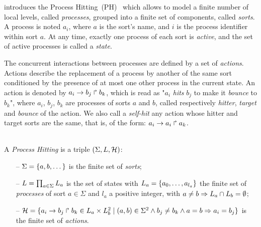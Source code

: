 

 introduces the Process Hitting~(PH)~\cite{pauleve2011modelisation}
which allows to model
a finite number of local levels,
called \emph{processes},
grouped into a finite set of components, called \emph{sorts}.
A process is noted $a_i$, where $a$ is the sort's name,
and $i$ is the process identifier within sort $a$.
At any time, exactly one process of each sort is \emph{active},
and the set of active processes is called a \emph{state}.

The concurrent interactions between processes are defined by a set of \emph{actions}.
Actions describe the replacement of a process by another of the same sort
conditioned by the presence of at most one other process in the current state.
An action is denoted by $a_i\rightarrow b_j\Rsh b_k$, which is read as
"$a_i$ \emph{hits} $b_j$ to make it \emph{bounce} to $b_k$",
where $a_i$, $b_j$, $b_k$ are processes of sorts $a$ and $b$,
called respectively \emph{hitter}, \emph{target} and
\emph{bounce} of the action.
We also call a \emph{self-hit} any action whose hitter and target sorts are the same,
that is, of the form: $a_i\rightarrow a_i\Rsh a_k$.

\begin{definition}\label{def:PH} \\
  A \emph{Process Hitting} is a triple $(\Sigma,L,\mathcal{H})$:
  \begin{itemize}
    \item[--]  $\Sigma = \{a,b,\dots\}$ is the finite set of \emph{sorts};
    \item[--]  $L = \prod_{a\in\Sigma} L_a$ is the set of states with
      $L_a = \{a_0,\dots,a_{l_a}\}$
      the finite set of \emph{processes} of sort $a\in\Sigma$
      and $l_a$ a positive integer, with $a\neq b\Rightarrow L_a \cap L_b = \emptyset$;
    \item[--]  $\mathcal{H} = \{ a_i\rightarrow b_j\Rsh b_k \in L_a \times L_b^2 \mid
      (a,b) \in \Sigma^2 \wedge b_j\neq b_k \wedge a=b\Rightarrow a_i=b_j\}$
      is the finite set of \emph{actions}.
  \end{itemize}
\end{definition}



